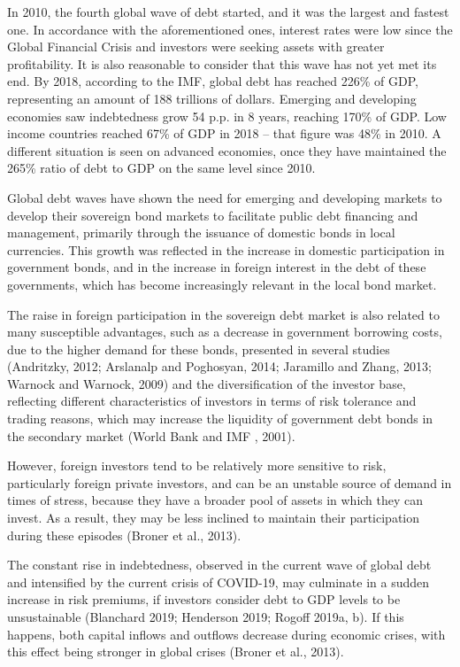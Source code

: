 \documentclass[
]{article}
\begin{document}
In 2010, the fourth global wave of debt started, and it was the largest
and fastest one. In accordance with the aforementioned ones, interest
rates were low since the Global Financial Crisis and investors were
seeking assets with greater profitability. It is also reasonable to
consider that this wave has not yet met its end. By 2018, according to
the IMF, global debt has reached 226\% of GDP, representing an amount of
188 trillions of dollars. Emerging and developing economies saw
indebtedness grow 54 p.p. in 8 years, reaching 170\% of GDP. Low income
countries reached 67\% of GDP in 2018 -- that figure was 48\% in 2010. A
different situation is seen on advanced economies, once they have
maintained the 265\% ratio of debt to GDP on the same level since 2010.

Global debt waves have shown the need for emerging and developing
markets to develop their sovereign bond markets to facilitate public
debt financing and management, primarily through the issuance of
domestic bonds in local currencies. This growth was reflected in the
increase in domestic participation in government bonds, and in the
increase in foreign interest in the debt of these governments, which has
become increasingly relevant in the local bond market.

The raise in foreign participation in the sovereign debt market is also
related to many susceptible advantages, such as a decrease in government
borrowing costs, due to the higher demand for these bonds, presented in
several studies (Andritzky, 2012; Arslanalp and Poghosyan, 2014;
Jaramillo and Zhang, 2013; Warnock and Warnock, 2009) and the
diversification of the investor base, reflecting different
characteristics of investors in terms of risk tolerance and trading
reasons, which may increase the liquidity of government debt bonds in
the secondary market (World Bank and IMF , 2001).

However, foreign investors tend to be relatively more sensitive to risk,
particularly foreign private investors, and can be an unstable source of
demand in times of stress, because they have a broader pool of assets in
which they can invest. As a result, they may be less inclined to
maintain their participation during these episodes (Broner et al.,
2013).

The constant rise in indebtedness, observed in the current wave of
global debt and intensified by the current crisis of COVID-19, may
culminate in a sudden increase in risk premiums, if investors consider
debt to GDP levels to be unsustainable (Blanchard 2019; Henderson 2019;
Rogoff 2019a, b). If this happens, both capital inflows and outflows
decrease during economic crises, with this effect being stronger in
global crises (Broner et al., 2013).
\end{document}
